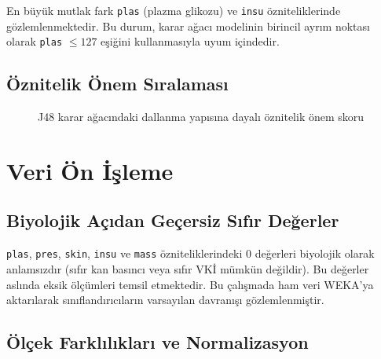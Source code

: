 \documentclass[12pt,a4paper]{article}
\begin{document}
En büyük mutlak fark \texttt{plas} (plazma glikozu) ve \texttt{insu}
özniteliklerinde gözlemlenmektedir. Bu durum, karar ağacı modelinin birincil
ayrım noktası olarak \texttt{plas} $\leq 127$ eşiğini kullanmasıyla uyum
içindedir.

\subsection{Öznitelik Önem Sıralaması}

\begin{figure}[H]
\centering
{}
\caption{J48 karar ağacındaki dallanma yapısına dayalı öznitelik önem skoru}
\label{fig:featimp}
\end{figure}

\section{Veri Ön İşleme}
\label{sec:preproc}

\subsection{Biyolojik Açıdan Geçersiz Sıfır Değerler}

\texttt{plas}, \texttt{pres}, \texttt{skin}, \texttt{insu} ve \texttt{mass}
özniteliklerindeki 0 değerleri biyolojik olarak anlamsızdır (sıfır kan basıncı
veya sıfır VKİ mümkün değildir). Bu değerler aslında eksik ölçümleri temsil
etmektedir. Bu çalışmada ham veri WEKA'ya aktarılarak sınıflandırıcıların
varsayılan davranışı gözlemlenmiştir.

\subsection{Ölçek Farklılıkları ve Normalizasyon}
\end{document}

